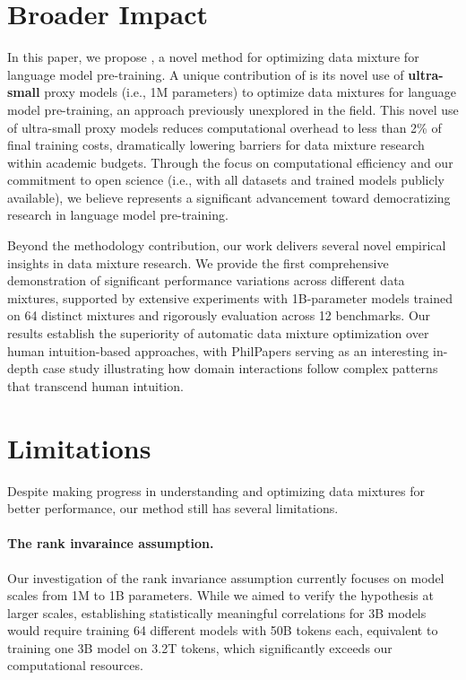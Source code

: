 \section{Broader Impact}\label{sec:broader_impact}

In this paper, we propose \ourmethod, a novel method for optimizing data mixture for language model pre-training. A unique contribution of \ourmethod is its novel use of \textbf{ultra-small} proxy models (i.e., 1M parameters) to optimize data mixtures for language model pre-training, an approach previously unexplored in the field. This novel use of ultra-small proxy models reduces computational overhead to less than 2\% of final training costs, dramatically lowering barriers for data mixture research within academic budgets. Through the focus on computational efficiency and our commitment to open science (i.e., with all datasets and trained models publicly available), we believe \ourmethod represents a significant advancement toward democratizing research in language model pre-training.

Beyond the methodology contribution, our work delivers several novel empirical insights in data mixture research. We provide the first comprehensive demonstration of significant performance variations across different data mixtures, supported by extensive experiments with 1B-parameter models trained on 64 distinct mixtures and rigorously evaluation across 12 benchmarks. Our results establish the superiority of automatic data mixture optimization over human intuition-based approaches, with PhilPapers serving as an interesting in-depth case study illustrating how domain interactions follow complex patterns that transcend human intuition.

\section{Limitations}
\label{sec:limitations}

Despite making progress in understanding and optimizing data mixtures for better performance, our method still has several limitations.

\paragraph{The rank invaraince assumption.} Our investigation of the rank invariance assumption currently focuses on model scales from 1M to 1B parameters. While we aimed to verify the hypothesis at larger scales, establishing statistically meaningful correlations for 3B models would require training 64 different models with 50B tokens each, equivalent to training one 3B model on 3.2T tokens, which significantly exceeds our computational resources.

